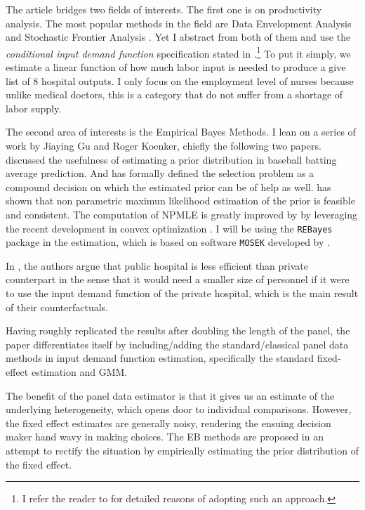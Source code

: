 \documentclass[12pt]{article}
\begin{document}
The article bridges two fields of interests. The first one is on productivity
analysis. The most popular methods in the field are Data Envelopment Analysis
\citep{charnes1978measuring} and Stochastic Frontier Analysis
\citep{aigner1977formulation,meeusen1977efficiency}. Yet I abstract from both
of them and use the \textit{conditional input demand function} specification
stated in \cite{croiset2024hospitals}.\footnote{I refer the reader to
    \citet{croiset2024hospitals} for detailed reasons of adopting such an
    approach.} To put it simply, we estimate a linear function of how much labor
input is needed to produce a give list of 8 hospital outputs. I only focus on
the employment level of nurses because unlike medical doctors, this is a
category that do not suffer from a shortage of labor supply.

The second area of interests is the Empirical Bayes Methods. I lean on a series
of work by Jiaying Gu and Roger Koenker, chiefly the following two papers.
\citet{gu2017empirical} discussed the usefulness of estimating a prior
distribution in baseball batting average prediction. And
\citet{gu2023invidious} has formally defined the selection problem as a
compound decision on which the estimated prior can be of help as well.
\citet{kiefer1956consistency} has shown that non parametric maximun likelihood
estimation of the prior is feasible and consistent. The computation of NPMLE is
greatly improved by \citet{koenker2014convex} by leveraging the recent
development in convex optimization \citep{andersen2010mosek}. I will be using
the \verb+REBayes+ package \citep{koenker2017rebayes} in the estimation, which
is based on software \verb+MOSEK+ developed by \citet{andersen2010mosek}.

In \cite{croiset2024hospitals}, the authors argue that public hospital is less
efficient than private counterpart in the sense that it would need a smaller
size of personnel if it were to use the input demand function of the private
hospital, which is the main result of their counterfactuals.

Having roughly replicated the results after doubling the length of the panel,
the paper differentiates itself by including/adding the standard/classical
panel data methods in input demand function estimation, specifically the
standard fixed-effect estimation and GMM.

The benefit of the panel data estimator is that it gives us an estimate of the
underlying heterogeneity, which opens door to individual comparisons. However,
the fixed effect estimates are generally noisy, rendering the ensuing decision
maker hand wavy in making choices. The EB methods are proposed in an attempt to
rectify the situation by empirically estimating the prior distribution of the
fixed effect.
\end{document}
